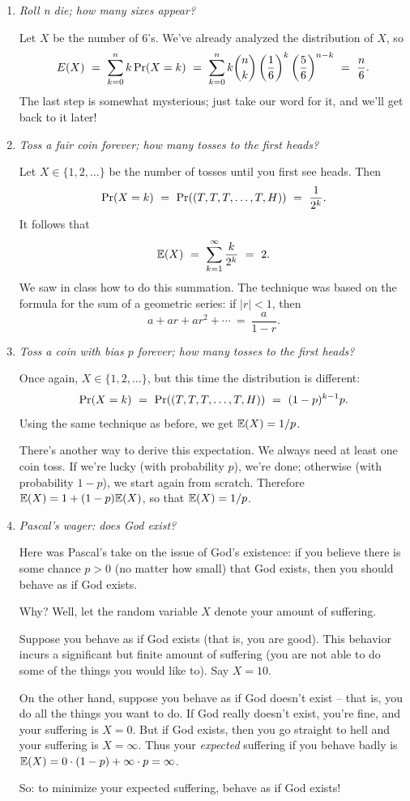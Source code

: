 \begin{enumerate}
\item {\it Roll n die; how many sixes appear?}

Let $X$ be the number of $6$'s. We've already analyzed the distribution of $X$, so
$$ E(X) 
\ = \ 
\sum_{k = 0}^n k \, \pr(X = k)
\ = \ 
\sum_{k = 0}^n k {n \choose k} \left(\frac{1}{6} \right)^k \left( \frac{5}{6} \right)^{n-k}
\ = \ 
\frac{n}{6}.
$$
The last step is somewhat mysterious; just take our word for it, and we'll get back to it later!

\item {\it Toss a fair coin forever; how many tosses to the first heads?}

Let $X \in \{1,2,\ldots\}$ be the number of tosses until you first see heads. Then
$$ \pr(X = k)
\ = \ 
\pr((T,T,T,\ldots,T,H))
\ = \ 
\frac{1}{2^k}.
$$
It follows that 
$$ \E(X) 
\ = \ 
\sum_{k=1}^\infty \frac{k}{2^k} 
\ = \ 
2.
$$
We saw in class how to do this summation. The technique was based on the formula for the
sum of a geometric series: if $|r| < 1$, then
$$ a + ar + ar^2 + \cdots \ = \ \frac{a}{1-r}.$$

\item {\it Toss a coin with bias $p$ forever; how many tosses to the first heads?}

Once again, $X \in \{1,2,\ldots\}$, but this time the distribution is different:
$$ \pr(X = k)
\ = \ 
\pr((T,T,T,\ldots,T,H))
\ = \ 
(1-p)^{k-1}p.
$$
Using the same technique as before, we get $\mathbb{E}(X) = 1/p$.

There's another way to derive this expectation. We always need at least one coin toss.
If we're lucky (with probability $p$), we're done; otherwise (with probability $1-p$),
we start again from scratch. Therefore $\mathbb{E}(X) = 1 + (1-p) \mathbb{E}(X)$, so that $\mathbb{E}(X) = 1/p$.

\item {\it Pascal's wager: does God exist?}

Here was Pascal's take on the issue of God's existence: if you believe there is
some chance $p > 0$ (no matter how small) that God exists, then you should behave
as if God exists.

Why? Well, let the random variable $X$ denote your amount of suffering.

Suppose you behave as if God exists (that is, you are good). This behavior incurs
a significant but finite amount of suffering (you are not able to do some of the
things you would like to). Say $X = 10$.

On the other hand, suppose you behave as if God doesn't exist -- that is, you 
do all the things you want to do. If God really doesn't exist, you're fine, and 
your suffering is $X = 0$. But if God exists, then you go straight to hell
and your suffering is $X = \infty$. Thus your {\it expected} suffering
if you behave badly is $\mathbb{E}(X) = 0 \cdot (1-p) + \infty \cdot p = \infty$.

So: to minimize your expected suffering, behave as if God exists!

\end{enumerate}



